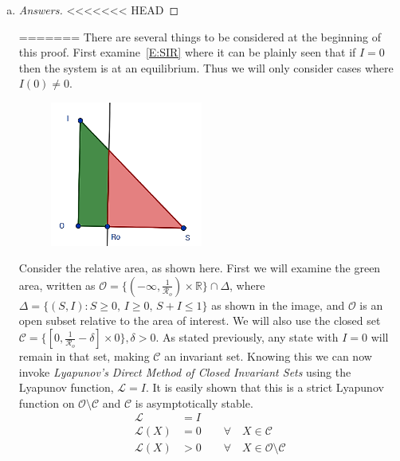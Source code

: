 \documentclass[12pt]{article}
\begin{document}
\begin{enumerate}[(a)]
\begin{enumerate}[(i)]
{\begin{proof}[Solution]
\end{proof}
}  
  
  \end{enumerate}
\item \basicSIRanalQc

{\color{blue}
\begin{proof}[Answers]

<<<<<<< HEAD
\end{proof}
}

=======
There are several things to be considered at the beginning of this proof. First examine~\eqref{E:SIR} where it can be plainly seen that if $I=0$ then the system is at an equilibrium. Thus we will only consider cases where $I(0)\neq 0$.
\begin{center}
\begin{figure}[h]
\includegraphics[width=5cm]{images/4MB3_A1_2c.png}
\end{figure}
\end{center}
Consider the relative area, as shown here. First we will examine the green area, written as ${\mathcal O}=\{(-\infty,\frac{1}{{\mathcal R}_o}) \times \mathbb{R}\}\cap \Delta$, where $\Delta=\{(S,I):S\ge0,\, I\ge0,\, S+I\le1\}$ as shown in the image, and ${\mathcal O}$ is an open subset relative to the area of interest. We will also use the closed set ${\mathcal C}=\{[0,\frac{1}{{\mathcal R}_o}-\delta]\times{0}\}, \delta > 0$. As stated previously, any state with $I=0$ will remain in that set, making $\mathcal C$ an invariant set. Knowing this we can now invoke \textit{Lyapunov's Direct Method of Closed Invariant Sets} using the Lyapunov function, $\mathcal{L} = I$. It is easily shown that this is a strict Lyapunov function on $\mathcal{O} \setminus \mathcal{C}$ and $\mathcal{C}$ is asymptotically stable.
\begin{equation}
{\displaystyle {\begin{aligned}
\mathcal{L}&=I \\
\mathcal{L}(X)&=0 \qquad \forall \quad X \in \mathcal{C} \\
\mathcal{L}(X) &> 0 \qquad \forall \quad X \in \mathcal{O} \setminus \mathcal{C} \\

\end{aligned}}}
\end{equation}
\end{enumerate}
\end{document}
